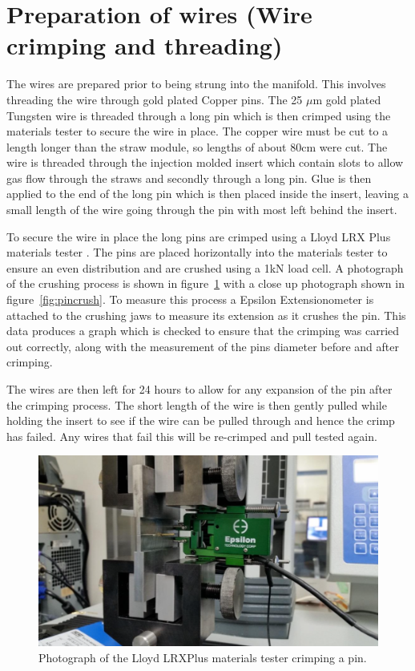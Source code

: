 \section{Preparation of wires (Wire crimping and threading)}

The wires are prepared prior to being strung into the manifold. This involves threading the wire through gold plated Copper pins. The 25 $\mu$m gold plated Tungsten wire is threaded through a long pin which is then crimped using the materials tester to secure the wire in place. The copper wire must be cut to a length longer than the straw module, so lengths of about 80cm were cut. The wire is threaded through the injection molded insert which contain slots to allow gas flow through the straws and secondly through a long pin. Glue is then applied to the end of the long pin which is then placed inside the insert, leaving a small length of the wire going through the pin with most left behind the insert. 

To secure the wire in place the long pins are crimped using a Lloyd LRX Plus materials tester \cite{LloydPlus}. The pins are placed horizontally into the materials tester to ensure an even distribution and are crushed using a 1kN load cell. A photograph of the crushing process is shown in figure~\ref{fig:crimpmachine} with a close up photograph shown in figure~\ref{fig:pincrush}. To measure this process a Epsilon Extensionometer \cite{Extensionometer} is attached to the crushing jaws to measure its extension as it crushes the pin. This data produces a graph which is checked to ensure that the crimping was carried out correctly, along with the measurement of the pins diameter before and after crimping.

The wires are then left for 24 hours to allow for any expansion of the pin after the crimping process. The short length of the wire is then gently pulled while holding the insert to see if the wire can be pulled through and hence the crimp has failed. Any wires that fail this will be re-crimped and pull tested again. 

\begin{figure}[ht]
\centering 
\includegraphics[scale=0.70]{Figures/crimpmachine}
\decoRule
\caption{Photograph of the Lloyd LRXPlus materials tester crimping a pin.}
\label{fig:crimpmachine}
\end{figure}

